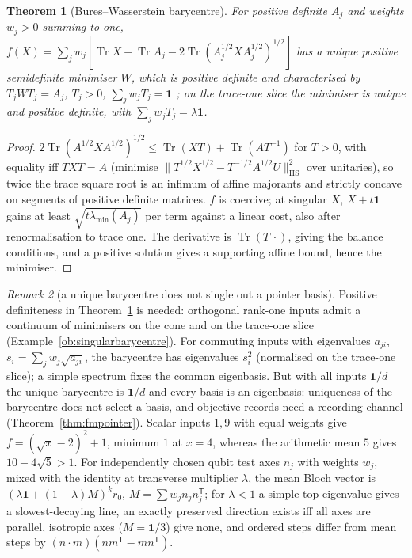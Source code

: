 \documentclass[aps,pra,onecolumn,superscriptaddress,nofootinbib,10pt]{revtex4-2}
\newtheorem{theorem}{Theorem}
\theoremstyle{definition}
\theoremstyle{remark}
\newtheorem{remark}[theorem]{Remark}
\newcommand{\tr}{\operatorname{Tr}}
\begin{document}
\begin{theorem}[Bures--Wasserstein barycentre]\label{thm:fmbary}
For positive definite $A_j$ and weights $w_j>0$ summing to one, $f(X)=\sum_jw_j[\tr X+\tr A_j-2\tr(A_j^{1/2}XA_j^{1/2})^{1/2}]$ has a unique positive
semidefinite minimiser $W$, which is positive definite and characterised by $T_jWT_j=A_j$, $T_j>0$, $\sum_jw_jT_j=\mathbf1$
\cite[Thm.~8, Eq.~(57)]{n2-bjl}; on the trace-one slice the minimiser is unique and positive definite, with
$\sum_jw_jT_j=\lambda\mathbf1$.
\end{theorem}
\begin{proof}
$2\tr(A^{1/2}XA^{1/2})^{1/2}\le\tr(XT)+\tr(AT^{-1})$ for $T>0$, with equality iff $TXT=A$ (minimise $\lVert T^{1/2}X^{1/2}-T^{-1/2}A^{1/2}U\rVert_{\mathrm{HS}}^2$ over unitaries), so twice the
trace square root is an infimum of affine majorants and strictly concave on segments of positive definite
matrices.  $f$ is coercive; at singular $X$, $X+t\mathbf1$ gains at least $\sqrt{t\lambda_{\min}(A_j)}$ per term against a linear cost, also after
renormalisation to trace one.  The derivative is $\tr(T\,\cdot)$, giving the balance conditions, and a positive solution
gives a supporting affine bound, hence the minimiser.
\end{proof}

\begin{remark}[a unique barycentre does not single out a pointer basis]\label{rem:fmaxisbary}
Positive definiteness in Theorem~\ref{thm:fmbary} is needed: orthogonal rank-one inputs admit a continuum of
minimisers on the cone and on the trace-one slice (Example~\ref{ob:singularbarycentre}).  For commuting inputs with eigenvalues $a_{ji}$, $s_i=\sum_jw_j\sqrt{a_{ji}}$, the barycentre has eigenvalues $s_i^2$ (normalised on the trace-one
slice); a simple spectrum fixes the common eigenbasis.  But with all inputs $\mathbf1/d$ the unique barycentre is $\mathbf1/d$
and every basis is an eigenbasis: uniqueness of the barycentre does not select a basis, and objective
records need a recording channel (Theorem~\ref{thm:fmpointer}).  Scalar inputs $1,9$ with equal weights give
$f=(\sqrt x-2)^2+1$, minimum $1$ at $x=4$, whereas the arithmetic mean $5$ gives $10-4\sqrt5>1$.  For independently chosen qubit
test axes $n_j$ with weights $w_j$, mixed with the identity at transverse multiplier $\lambda$, the mean Bloch vector is
$(\lambda\mathbf1+(1-\lambda)M)^kr_0$, $M=\sum w_jn_jn_j^{\mathsf T}$; for $\lambda<1$ a simple top eigenvalue gives a slowest-decaying line, an exactly
preserved direction exists iff all axes are parallel, isotropic axes ($M=\mathbf1/3$) give none, and ordered steps
differ from mean steps by $(n\cdot m)(nm^{\mathsf T}-mn^{\mathsf T})$.
\end{remark}
\end{document}
